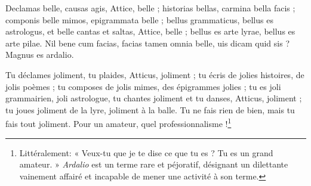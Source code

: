 \documentclass[12pt]{book}
\begin{document}
  \begin{alignment}
    \begin{edition}
          Declamas belle, causas agis, Attice, belle ; 
          historias bellas, carmina bella facis ; 
          componis belle mimos, epigrammata belle ; 
          bellus grammaticus, bellus es astrologus,  
          et belle cantas et saltas, Attice, belle ; 
          bellus es arte lyrae, bellus es arte pilae. 
          Nil bene cum facias, facias tamen omnia belle, 
          uis dicam quid sis ? Magnus es ardalio. 
    \end{edition}
    \begin{translation}
                Tu déclames joliment, tu plaides, Atticus, joliment ; 
                tu écris de jolies histoires, de jolis poèmes ; 
                tu composes de jolis mimes, des épigrammes jolies ; 
                tu es joli grammairien, joli astrologue, 
                tu chantes joliment et tu danses, Atticus, joliment ; 
                tu joues joliment de la lyre, joliment à la balle. 
                Tu ne fais rien de bien, mais tu fais tout joliment. 
                Pour un amateur, quel professionnalisme !\footnote{Littéralement: « Veux-tu que je te dise ce que tu es ? Tu es un grand amateur. » \emph{Ardalio} est un terme rare et péjoratif, désignant un dilettante vainement affairé et incapable de mener une activité à son terme.} 
    \end{translation}
  \end{alignment}

\end{document}
